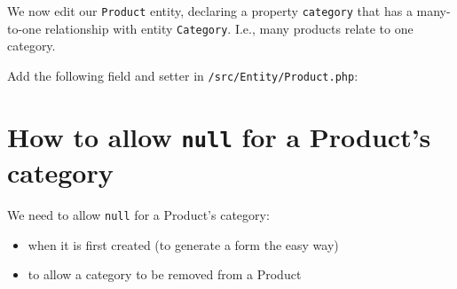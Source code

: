 \documentclass[a4paperpaper,openright]{book}
\newenvironment{Shaded}{}{}
\newcommand{\AnnotationTok}[1]{\textcolor[rgb]{0.38,0.63,0.69}{\textbf{\textit{#1}}}}
\newcommand{\CommentTok}[1]{\textcolor[rgb]{0.38,0.63,0.69}{\textit{#1}}}
\newcommand{\KeywordTok}[1]{\textcolor[rgb]{0.00,0.44,0.13}{\textbf{#1}}}
\newcommand{\NormalTok}[1]{#1}
\newcommand{\OtherTok}[1]{\textcolor[rgb]{0.00,0.44,0.13}{#1}}
\newcommand{\StringTok}[1]{\textcolor[rgb]{0.25,0.44,0.63}{#1}}
\begin{document}
We now edit our \texttt{Product} entity, declaring a property
\texttt{category} that has a many-to-one relationship with entity
\texttt{Category}. I.e., many products relate to one category.

Add the following field and setter in \texttt{/src/Entity/Product.php}:

\begin{Shaded}
\end{Shaded}

\hypertarget{how-to-allow-null-for-a-products-category}{%
\section{\texorpdfstring{How to allow \texttt{null} for a Product's
category}{How to allow null for a Product's category}}\label{how-to-allow-null-for-a-products-category}}

We need to allow \texttt{null} for a Product's category:

\begin{itemize}
\item
  when it is first created (to generate a form the easy way)
\item
  to allow a category to be removed from a Product
\end{itemize}
\end{document}
